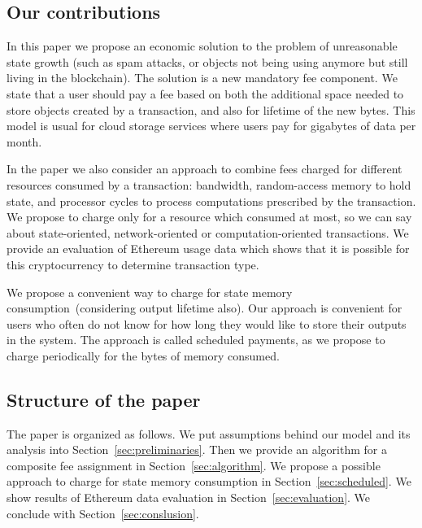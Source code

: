 \documentclass[]{llncs}   %
\begin{document}
\subsection{Our contributions}

In this paper we propose an economic solution to the problem of unreasonable state growth
(such as spam attacks, or objects not being using anymore but still living in
the blockchain). The solution is a new mandatory fee component. We state that a
user should pay a fee based on both the additional space needed to store objects
created by a transaction, and also for lifetime of the new bytes. This model is
usual for cloud storage services where users pay for gigabytes of data per
month. 

In the paper we also consider an approach to combine fees charged for different resources consumed by a transaction:
bandwidth, random-access memory to hold state, and processor cycles to process computations prescribed by the transaction.    
We propose to charge only for a resource which consumed at most, so we can say about state-oriented, network-oriented or computation-oriented transactions. We provide an evaluation of Ethereum usage data which shows that it is possible for this cryptocurrency to determine transaction type.

We propose a convenient way to charge for state memory consumption~(considering output lifetime also). Our approach is convenient for users who often do not know for how long they would like to store their outputs in the system. The approach is called scheduled payments, as we propose to charge periodically for the bytes of memory consumed.






\subsection{Structure of the paper}
The paper is organized as follows. We put assumptions behind our model and its analysis into Section~\ref{sec:preliminaries}. Then we provide an algorithm for a composite fee assignment in Section~\ref{sec:algorithm}. We propose a possible approach to charge for state memory consumption in Section~\ref{sec:scheduled}. We show results of Ethereum data evaluation in Section~\ref{sec:evaluation}. We conclude with Section~\ref{sec:conslusion}.
\end{document}
